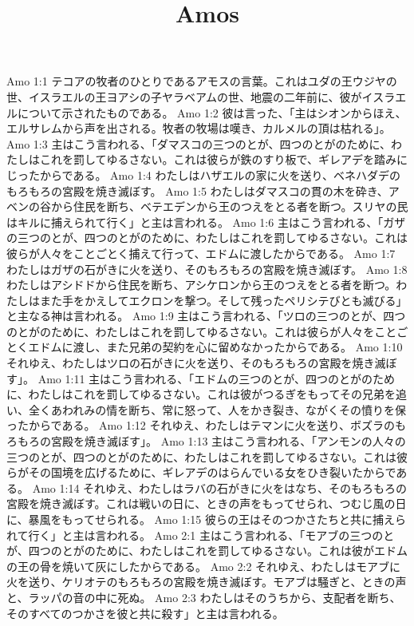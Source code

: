 

\title{Amos}

Amo 1:1  テコアの牧者のひとりであるアモスの言葉。これはユダの王ウジヤの世、イスラエルの王ヨアシの子ヤラベアムの世、地震の二年前に、彼がイスラエルについて示されたものである。
Amo 1:2  彼は言った、「主はシオンからほえ、エルサレムから声を出される。牧者の牧場は嘆き、カルメルの頂は枯れる」。
Amo 1:3  主はこう言われる、「ダマスコの三つのとが、四つのとがのために、わたしはこれを罰してゆるさない。これは彼らが鉄のすり板で、ギレアデを踏みにじったからである。
Amo 1:4  わたしはハザエルの家に火を送り、ベネハダデのもろもろの宮殿を焼き滅ぼす。
Amo 1:5  わたしはダマスコの貫の木を砕き、アベンの谷から住民を断ち、ベテエデンから王のつえをとる者を断つ。スリヤの民はキルに捕えられて行く」と主は言われる。
Amo 1:6  主はこう言われる、「ガザの三つのとが、四つのとがのために、わたしはこれを罰してゆるさない。これは彼らが人々をことごとく捕えて行って、エドムに渡したからである。
Amo 1:7  わたしはガザの石がきに火を送り、そのもろもろの宮殿を焼き滅ぼす。
Amo 1:8  わたしはアシドドから住民を断ち、アシケロンから王のつえをとる者を断つ。わたしはまた手をかえしてエクロンを撃つ。そして残ったペリシテびとも滅びる」と主なる神は言われる。
Amo 1:9  主はこう言われる、「ツロの三つのとが、四つのとがのために、わたしはこれを罰してゆるさない。これは彼らが人々をことごとくエドムに渡し、また兄弟の契約を心に留めなかったからである。
Amo 1:10  それゆえ、わたしはツロの石がきに火を送り、そのもろもろの宮殿を焼き滅ぼす」。
Amo 1:11  主はこう言われる、「エドムの三つのとが、四つのとがのために、わたしはこれを罰してゆるさない。これは彼がつるぎをもってその兄弟を追い、全くあわれみの情を断ち、常に怒って、人をかき裂き、ながくその憤りを保ったからである。
Amo 1:12  それゆえ、わたしはテマンに火を送り、ボズラのもろもろの宮殿を焼き滅ぼす」。
Amo 1:13  主はこう言われる、「アンモンの人々の三つのとが、四つのとがのために、わたしはこれを罰してゆるさない。これは彼らがその国境を広げるために、ギレアデのはらんでいる女をひき裂いたからである。
Amo 1:14  それゆえ、わたしはラバの石がきに火をはなち、そのもろもろの宮殿を焼き滅ぼす。これは戦いの日に、ときの声をもってせられ、つむじ風の日に、暴風をもってせられる。
Amo 1:15  彼らの王はそのつかさたちと共に捕えられて行く」と主は言われる。
Amo 2:1  主はこう言われる、「モアブの三つのとが、四つのとがのために、わたしはこれを罰してゆるさない。これは彼がエドムの王の骨を焼いて灰にしたからである。
Amo 2:2  それゆえ、わたしはモアブに火を送り、ケリオテのもろもろの宮殿を焼き滅ぼす。モアブは騒ぎと、ときの声と、ラッパの音の中に死ぬ。
Amo 2:3  わたしはそのうちから、支配者を断ち、そのすべてのつかさを彼と共に殺す」と主は言われる。
